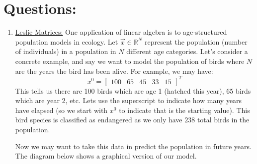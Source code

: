 \documentclass[11pt, a4paper]{article}
\begin{document}
\section*{Questions:}
\begin{enumerate}
\item \underline{Leslie Matrices:} 
One application of linear algebra is to age-structured population models in ecology. Let $\vec{x} \in \mathbb{R}^N $ represent the population (number of individuals) in a population in $N$ different age categories. 
Let's consider a concrete example, and say we want to model the population of birds where $N$ are the years the bird has been alive. For example, we may have:
\begin{equation}
x^0=
\begin{bmatrix}
100 &
65 &
45 &
33 &
15
\end{bmatrix}^T
\end{equation}
This tells us there are 100 birds which are age 1 (hatched this year), 65 birds which are year 2, etc. Lets use the superscript to indicate how many years have elapsed (so we start with $x^0$ to indicate that is the starting value). This bird species is classified as endangered as we only have $238$ total birds in the population. 

Now we may want to take this data in predict the population in future years. The diagram below shows a graphical version of our model. 
\begin{center}
\end{center}






\end{enumerate}
\end{document}
